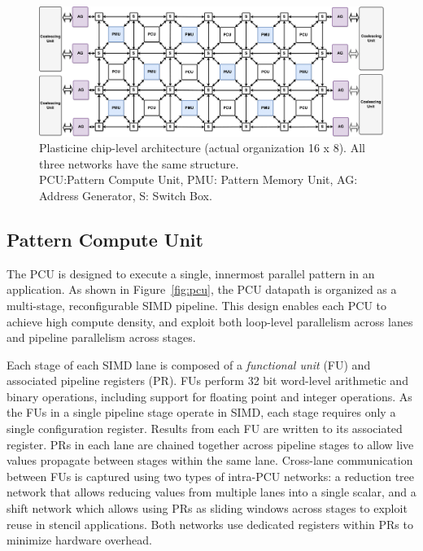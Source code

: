\begin{figure}[ht]
\centering
\includegraphics[width=0.9 \textwidth]{figs/network.pdf}
  \vspace{-10pt}
  \caption{Plasticine chip-level architecture (actual organization 16 x 8). All three networks have
  the same structure. \\
  PCU:Pattern Compute Unit, PMU: Pattern Memory Unit, AG: Address Generator, S: Switch Box.}
  \label{fig:interconnect}
  \vspace{0pt}
\end{figure}

\subsection{Pattern Compute Unit}
\label{ssec:PCU}


The PCU is designed to execute a single, innermost parallel pattern in
an application. As shown in Figure~\ref{fig:pcu}, the PCU datapath is organized as a multi-stage, reconfigurable SIMD pipeline.
This design enables each PCU to achieve high compute density, and exploit both loop-level
parallelism across lanes and pipeline parallelism across stages.

Each stage of each SIMD lane is composed of a \emph{functional unit} (FU) and associated pipeline registers
(PR). FUs perform
32 bit word-level arithmetic and binary operations, including support for floating point and integer operations. 
As the FUs in a single pipeline stage operate in SIMD, each stage requires only a single configuration register.
Results from each FU are written to its associated register. 
PRs in each lane are chained together across pipeline
stages to allow live values  propagate between stages within the
same lane. Cross-lane communication between FUs is captured using two types of intra-PCU networks: a reduction tree network that allows
reducing values from multiple lanes into a single scalar, and a shift network which allows using PRs as sliding windows
across stages to exploit reuse in stencil applications.
Both networks use dedicated registers within PRs to minimize hardware overhead.

